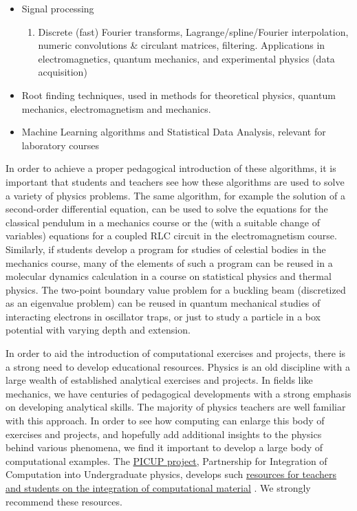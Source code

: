 \documentclass[graybox,envcountchap,sectrefs]{svmult}
\begin{document}
\begin{itemize}
\begin{enumerate}
\end{enumerate}


\item Signal processing
\begin{enumerate}

  \item Discrete (fast) Fourier transforms, Lagrange/spline/Fourier interpolation, numeric convolutions {\&} circulant matrices, filtering. Applications in electromagnetics, quantum mechanics, and experimental physics (data acquisition)

\end{enumerate}


\item Root finding techniques, used in methods for theoretical physics, quantum mechanics, electromagnetism and mechanics.

\item Machine Learning algorithms and Statistical Data Analysis, relevant for laboratory courses
\end{itemize}


In order to achieve a proper pedagogical introduction of these
algorithms, it is important that students and teachers see how
these algorithms are used to solve a variety of physics problems. The
same algorithm, for example the solution of a second-order
differential equation, can be used to solve the equations for the
classical pendulum in a mechanics course or the (with a suitable
change of variables) equations for a coupled RLC circuit in the
electromagnetism course. Similarly, if students develop a program for
studies of celestial bodies in the mechanics course, many of the
elements of such a program can be reused in a molecular dynamics
calculation in a course on statistical physics and thermal
physics. The two-point boundary value problem for a buckling beam
(discretized as an eigenvalue problem) can be reused in quantum
mechanical studies of interacting electrons in oscillator traps, or
just to study a particle in a box potential with varying depth and
extension.

In order to aid the introduction of computational exercises and
projects, there is a strong need to develop educational resources.
Physics is an old discipline with a large wealth of established analytical exercises and
projects. In fields like mechanics, we have centuries of pedagogical
developments with a strong emphasis on developing analytical
skills. The majority of physics teachers are well familiar with this approach.
In order to see how computing  can enlarge this body of exercises
and projects, and hopefully add additional insights to the physics
behind various phenomena, we find it important to develop a large body
of computational examples.
The
\href{{http://www.compadre.org/picup/}}{PICUP project}, Partnership for
Integration of Computation into Undergraduate physics, develops such
\href{{http://www.compadre.org/PICUP/resources/}}{resources for teachers and students on the integration of
computational material} \cite{PICUP}.
We strongly recommend these resources.
\end{document}
